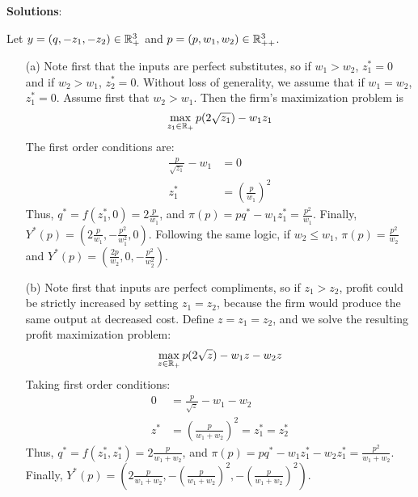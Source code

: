 \documentclass[12pt]{article}
\begin{document}
\medskip

\textbf{Solutions}:

\medskip

Let $y = (q,-z_1,-z_2) \in \mathbb{R}^3_+$ and $p = (p, w_1,w_2) \in \mathbb{R}^3_{++}$. 

\begin{itemize}
    \item[(a)] Note first that the inputs are perfect substitutes, so if $w_1 > w_2$, $z^*_1 = 0$ and if $w_2 > w_1$, $z^*_2 = 0$. Without loss of generality, we assume that if $w_1 = w_2$, $z^*_1 = 0$. Assume first that $w_2 > w_1$. Then the firm's maximization problem is
    \[
    \max_{z_1 \in \mathbb{R}_+} p(2\sqrt{z_1}) - w_1 z_1
    \]
    The first order conditions are:
    \begin{align*}
    \frac{p}{\sqrt{z_1}} - w_1 &= 0 \\
    z_1^* &= \left(\frac{p}{w_1}\right)^2
    \end{align*}
    Thus, $q^* = f(z_1^*,0) = 2\frac{p}{w_1}$, and $\pi(p) = p q^* - w_1 z^*_1 = \frac{p^2}{w_1}$. Finally, $Y^*(p) = (2\frac{p}{w_1},-\frac{p^2}{w_1^2},0)$. Following the same logic, if $w_2 \le w_1$, $\pi(p) = \frac{p^2}{w_2}$ and $Y^*(p) = (\frac{2p}{w_2},0,-\frac{p^2}{w_2^2})$.

    \item[(b)] Note first that inputs are perfect compliments, so if $z_1 > z_2$, profit could be strictly increased by setting $z_1 = z_2$, because the firm would produce the same output at decreased cost. Define $z = z_1 = z_2$, and we solve the resulting profit maximization problem:
    \[
    \max_{z \in \mathbb{R}_+} p(2\sqrt{z}) - w_1 z - w_2 z
    \]
    Taking first order conditions:
    \begin{align*}
        0 &= \frac{p}{\sqrt{z}} - w_1 - w_2 \\
        z^* &= \left(\frac{p}{w_1+w_2} \right)^2 = z_1^* = z_2^*
    \end{align*}
    Thus, $q^* = f(z_1^*,z_1^*) =  2\frac{p}{w_1+w_2}$, and $\pi(p) = p q^* - w_1 z_1^* - w_2 z_1^* = \frac{p^2}{w_1 + w_2}$. Finally, $Y^*(p) = (2\frac{p}{w_1+w_2},- \left(\frac{p}{w_1+w_2} \right)^2,- \left(\frac{p}{w_1+w_2} \right)^2)$.


\end{itemize}
\end{document}
